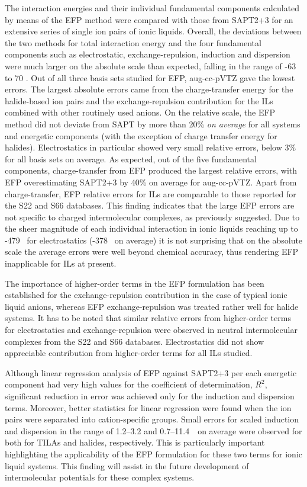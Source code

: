 
The interaction energies and their individual fundamental components calculated by means of the EFP method were compared with those from SAPT2+3 for an extensive series of single ion pairs of ionic liquids.
Overall, the deviations between the two methods for total interaction energy and the four fundamental components such as electrostatic, exchange-repulsion, induction and dispersion were much larger on the absolute scale than expected, falling in the range of -63 to 70 \enUnit. 
Out of all three basis sets studied for EFP, aug-cc-pVTZ gave the lowest errors.
The largest absolute errors came from the charge-transfer energy for the halide-based ion pairs and the exchange-repulsion contribution for the ILs combined with other routinely used anions. 
On the relative scale, the EFP method did not deviate from SAPT by more than 20\% \emph{on average} for all systems and energetic components (with the exception of charge transfer energy for halides). 
Electrostatics in particular showed very small relative errors, below 3\% for all basis sets on average.
As expected, out of the five fundamental components, charge-transfer from EFP produced the largest relative errors, with EFP overestimating SAPT2+3 by 40\% on average for aug-cc-pVTZ.
Apart from charge-transfer, EFP relative errors for ILs are comparable to those reported for the S22 and S66 databases.
\cite{Flick2012a}
This finding indicates that the large EFP errors are not specific to charged intermolecular complexes, as previously suggested.
Due to the sheer magnitude of each individual interaction in ionic liquids reaching up to -479 \enUnit~for electrostatics (-378 \enUnit~on average) it is not surprising that on the absolute scale the average errors were well beyond chemical accuracy, thus rendering EFP inapplicable for ILs at present.


The importance of higher-order terms in the EFP formulation has been established for the exchange-repulsion contribution in the case of typical ionic liquid anions, whereas EFP exchange-repulsion was treated rather well for halide systems.  
It has to be noted that similar relative errors from higher-order terms for electrostatics and exchange-repulsion were observed in neutral intermolecular complexes from the S22 and S66 databases. 
Electrostatics did not show appreciable contribution from higher-order terms for all ILs studied.


Although linear regression analysis of EFP against SAPT2+3 per each energetic component had very high values for the coefficient of determination, $R^2$, significant reduction in error was achieved only for the induction and dispersion terms. 
Moreover, better statistics for linear regression were found when the ion pairs were separated into cation-specific groups. 
Small errors for scaled induction and dispersion in the range of 1.2--3.2 and 0.7--11.4~\enUnit~on average were observed for both for TILAs and halides, respectively. 
This is particularly important highlighting the applicability of the EFP formulation for these two terms for ionic liquid systems. 
This finding will assist in the future development of intermolecular potentials for these complex systems.  

